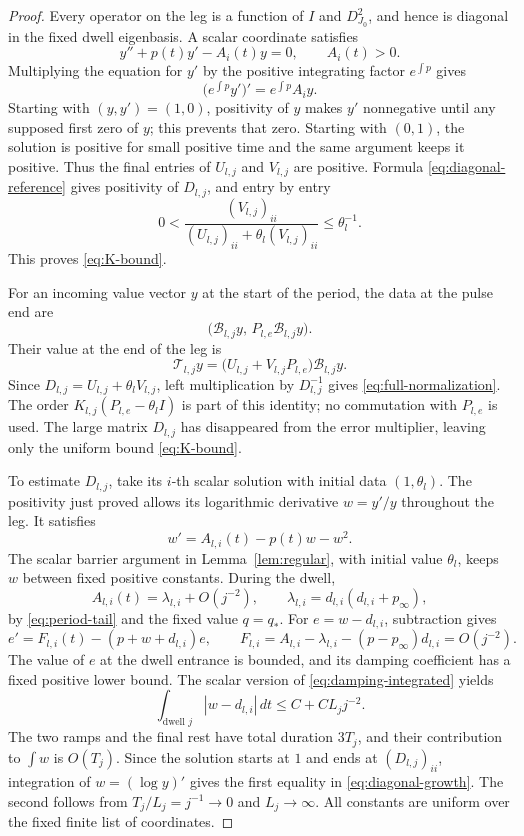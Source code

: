 \begin{proof}
Every operator on the leg is a function of \(I\) and
\(D_{J_0}^2\), and hence is diagonal in the fixed dwell
eigenbasis.  A scalar coordinate satisfies
\[
 y''+p(t)y'-A_i(t)y=0,\qquad A_i(t)>0.
\]
Multiplying the equation for \(y'\) by the positive integrating
factor \(e^{\int p}\) gives
\[
 \bigl(e^{\int p}y'\bigr)'=e^{\int p}A_i y.
\]
Starting with \((y,y')=(1,0)\), positivity of \(y\) makes \(y'\)
nonnegative until any supposed first zero of \(y\); this prevents
that zero.  Starting with \((0,1)\), the solution is positive
for small positive time and the same argument keeps it positive.
Thus the final entries of \(U_{l,j}\) and \(V_{l,j}\) are
positive.  Formula \eqref{eq:diagonal-reference} gives positivity
of \(D_{l,j}\), and entry by entry
\[
 0<\frac{(V_{l,j})_{ii}}
          {(U_{l,j})_{ii}+\theta_l(V_{l,j})_{ii}}
 \leq\theta_l^{-1}.
\]
This proves \eqref{eq:K-bound}.

For an incoming value vector \(y\) at the start of the period,
the data at the pulse end are
\[
 \bigl(\mathcal B_{l,j}y,\,
       P_{l,e}\mathcal B_{l,j}y\bigr).
\]
Their value at the end of the leg is
\[
 \mathcal T_{l,j}y
 =\bigl(U_{l,j}+V_{l,j}P_{l,e}\bigr)\mathcal B_{l,j}y.
\]
Since \(D_{l,j}=U_{l,j}+\theta_lV_{l,j}\), left multiplication
by \(D_{l,j}^{-1}\) gives \eqref{eq:full-normalization}.
The order \(K_{l,j}(P_{l,e}-\theta_lI)\) is part of this
identity; no commutation with \(P_{l,e}\) is used.  The large
matrix \(D_{l,j}\) has disappeared from the error multiplier,
leaving only the uniform bound \eqref{eq:K-bound}.

To estimate \(D_{l,j}\), take its \(i\)-th scalar solution with
initial data \((1,\theta_l)\).  The positivity just proved
allows its logarithmic derivative \(w=y'/y\) throughout the
leg.  It satisfies
\[
 w'=A_{l,i}(t)-p(t)w-w^2.
\]
The scalar barrier argument in Lemma~\ref{lem:regular}, with
initial value \(\theta_l\), keeps \(w\) between fixed positive
constants.  During the dwell,
\[
 A_{l,i}(t)=\lambda_{l,i}+O(j^{-2}),\qquad
 \lambda_{l,i}=d_{l,i}(d_{l,i}+p_\infty),
\]
by \eqref{eq:period-tail} and the fixed value \(q=q_*\).
For \(e=w-d_{l,i}\), subtraction gives
\[
 e'=F_{l,i}(t)-(p+w+d_{l,i})e,\qquad
 F_{l,i}=A_{l,i}-\lambda_{l,i}
                 -(p-p_\infty)d_{l,i}=O(j^{-2}).
\]
The value of \(e\) at the dwell entrance is bounded, and its
damping coefficient has a fixed positive lower bound.  The
scalar version of \eqref{eq:damping-integrated} yields
\[
 \int_{\text{dwell }j}|w-d_{l,i}|\,dt
 \leq C+C L_jj^{-2}.
\]
The two ramps and the final rest have total duration \(3T_j\),
and their contribution to \(\int w\) is \(O(T_j)\).  Since the
solution starts at \(1\) and ends at \((D_{l,j})_{ii}\),
integration of \(w=(\log y)'\) gives the first equality in
\eqref{eq:diagonal-growth}.  The second follows from
\(T_j/L_j=j^{-1}\to0\) and \(L_j\to\infty\).  All constants
are uniform over the fixed finite list of coordinates.
\end{proof}

